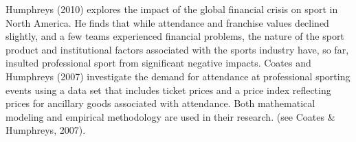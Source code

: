 \documentclass[man, fleqn, noextraspace,floatsintext]{apa6}
\newenvironment{Shaded}{\begin{snugshade}}{\end{snugshade}}
\newcommand{\CommentTok}[1]{\textcolor[rgb]{0.56,0.35,0.01}{\textit{#1}}}
\newcommand{\DataTypeTok}[1]{\textcolor[rgb]{0.13,0.29,0.53}{#1}}
\newcommand{\KeywordTok}[1]{\textcolor[rgb]{0.13,0.29,0.53}{\textbf{#1}}}
\newcommand{\NormalTok}[1]{#1}
\newcommand{\OperatorTok}[1]{\textcolor[rgb]{0.81,0.36,0.00}{\textbf{#1}}}
\newcommand{\StringTok}[1]{\textcolor[rgb]{0.31,0.60,0.02}{#1}}
\begin{document}
Humphreys (2010) explores the impact of the global financial crisis on sport in North America. He finds that while attendance and franchise values declined slightly, and a few teams experienced financial problems, the nature of the sport product and institutional factors associated with the sports industry have, so far, insulted professional sport from significant negative impacts. Coates and Humphreys (2007) investigate the demand for attendance at professional sporting events using a data set that includes ticket prices and a price index reflecting prices for ancillary goods associated with attendance. Both mathematical modeling and empirical methodology are used in their research. (see Coates \& Humphreys, 2007).

\begin{Shaded}
\end{Shaded}
\end{document}
